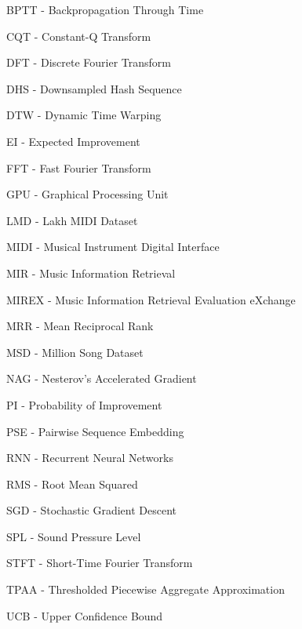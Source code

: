 BPTT - Backpropagation Through Time

CQT - Constant-Q Transform

DFT - Discrete Fourier Transform

DHS - Downsampled Hash Sequence

DTW - Dynamic Time Warping

EI - Expected Improvement

FFT - Fast Fourier Transform

GPU - Graphical Processing Unit

LMD - Lakh MIDI Dataset

MIDI - Musical Instrument Digital Interface

MIR - Music Information Retrieval

MIREX - Music Information Retrieval Evaluation eXchange

MRR - Mean Reciprocal Rank

MSD - Million Song Dataset

NAG - Nesterov's Accelerated Gradient

PI - Probability of Improvement

PSE - Pairwise Sequence Embedding

RNN - Recurrent Neural Networks

RMS - Root Mean Squared

SGD - Stochastic Gradient Descent

SPL - Sound Pressure Level

STFT - Short-Time Fourier Transform

TPAA - Thresholded Piecewise Aggregate Approximation

UCB - Upper Confidence Bound
